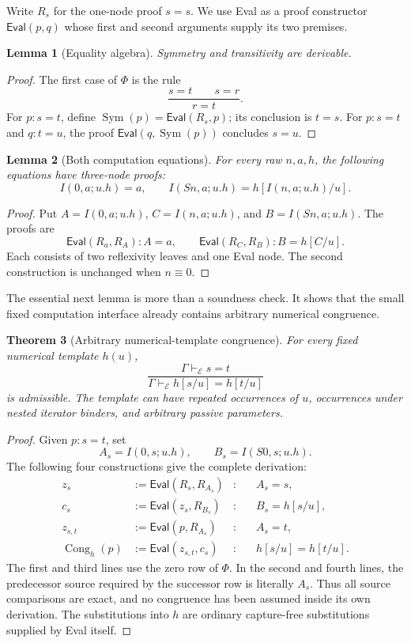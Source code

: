 \documentclass[11pt]{article}
\newtheorem{theorem}{Theorem}[section]
\newtheorem{lemma}[theorem]{Lemma}
\theoremstyle{definition}
\newcommand{\E}{\mathcal E}
\newcommand{\ev}{\mathsf{Eval}}
\newcommand{\syn}{\equiv}
\newcommand{\prf}[2]{#1\vdash_{\E}#2}
\begin{document}
Write $R_s$ for the one-node proof $s=s$. We use Eval as a proof
constructor $\ev(p,q)$ whose first and second arguments supply its two
premises.

\begin{lemma}[Equality algebra]
Symmetry and transitivity are derivable.
\end{lemma}
\begin{proof}
The first case of $\Phi$ is the rule
\[
 \frac{s=t\qquad s=r}{r=t}.
\]
For $p:s=t$, define $\operatorname{Sym}(p)=\ev(R_s,p)$; its conclusion is
$t=s$. For $p:s=t$ and $q:t=u$, the proof
$\ev(q,\operatorname{Sym}(p))$ concludes $s=u$.
\end{proof}

\begin{lemma}[Both computation equations]
For every raw $n,a,h$, the following equations have three-node proofs:
\[
 I(0,a;u.h)=a,\qquad
 I(Sn,a;u.h)=h[I(n,a;u.h)/u].
 \tag{I0, IS}\label{eq:computations}
\]
\end{lemma}
\begin{proof}
Put $A=I(0,a;u.h)$, $C=I(n,a;u.h)$, and $B=I(Sn,a;u.h)$. The proofs are
\[
 \ev(R_a,R_A):A=a,
 \qquad
 \ev(R_C,R_B):B=h[C/u].
\]
Each consists of two reflexivity leaves and one Eval node. The second
construction is unchanged when $n\syn0$.
\end{proof}

The essential next lemma is more than a soundness check. It shows that
the small fixed computation interface already contains arbitrary numerical
congruence.

\begin{theorem}[Arbitrary numerical-template congruence]
\label{thm:congruence}
For every fixed numerical template $h(u)$,
\[
 \frac{\prf{\Gamma}{s=t}}
       {\prf{\Gamma}{h[s/u]=h[t/u]}}
\]
is admissible. The template can have repeated occurrences of $u$,
occurrences under nested iterator binders, and arbitrary passive parameters.
\end{theorem}
\begin{proof}
Given $p:s=t$, set
\[
 A_s=I(0,s;u.h),\qquad B_s=I(S0,s;u.h).
\]
The following four constructions give the complete derivation:
\begin{align*}
 z_s&:=\ev(R_s,R_{A_s}) &: &\quad A_s=s,\\
 c_s&:=\ev(z_s,R_{B_s}) &: &\quad B_s=h[s/u],\\
 z_{s,t}&:=\ev(p,R_{A_s}) &: &\quad A_s=t,\\
 \operatorname{Cong}_h(p)&:=\ev(z_{s,t},c_s)
   &: &\quad h[s/u]=h[t/u].
\end{align*}
The first and third lines use the zero row of $\Phi$. In the second
and fourth lines, the predecessor source required by the successor row
is literally $A_s$. Thus all source comparisons are exact, and no
congruence has been assumed inside its own derivation. The substitutions
into $h$ are ordinary capture-free substitutions supplied by Eval itself.
\end{proof}
\end{document}
